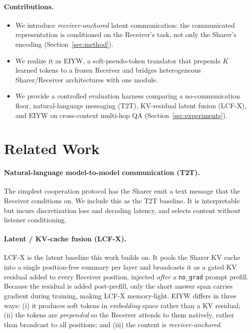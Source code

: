 \documentclass[11pt]{article}
\newcommand{\method}{\textsc{EIYW}\xspace}      %
\newcommand{\lcfx}{\textsc{LCF-X}\xspace}        %
\newcommand{\ttt}{\textsc{T2T}\xspace}           %
\newcommand{\sharer}{\textsf{Sharer}\xspace}
\newcommand{\receiver}{\textsf{Receiver}\xspace}
\begin{document}
\paragraph{Contributions.}
\begin{itemize}
  \item We introduce \emph{receiver-anchored} latent communication: the
  communicated representation is conditioned on the \receiver's task, not only
  the \sharer's encoding (Section~\ref{sec:method}).
  \item We realize it as \method, a soft-pseudo-token translator that prepends
  $K$ learned tokens to a frozen \receiver and bridges heterogeneous
  \sharer/\receiver architectures with one module.
  \item We provide a controlled evaluation harness comparing a no-communication
  floor, natural-language messaging (\ttt), KV-residual latent fusion (\lcfx),
  and \method on cross-context multi-hop QA (Section~\ref{sec:experiments}).
\end{itemize}

\section{Related Work}
\paragraph{Natural-language model-to-model communication (\ttt).} The simplest
cooperation protocol has the \sharer emit a text message that the \receiver
conditions on. We include this as the \ttt baseline. It is interpretable but
incurs discretization loss and decoding latency, and selects content without
listener conditioning.

\paragraph{Latent / KV-cache fusion (\lcfx).} \lcfx is the latent baseline this
work builds on. It pools the \sharer KV cache into a single position-free
summary per layer and broadcasts it as a gated KV residual added to every
\receiver position, injected \emph{after} a \texttt{no\_grad} prompt prefill.
Because the residual is added post-prefill, only the short answer span carries
gradient during training, making \lcfx memory-light. \method differs in three
ways: (i) it produces soft tokens in \emph{embedding} space rather than a KV
residual; (ii) the tokens are \emph{prepended} so the \receiver attends to them
natively, rather than broadcast to all positions; and (iii) the content is
\emph{receiver-anchored}.
\end{document}
